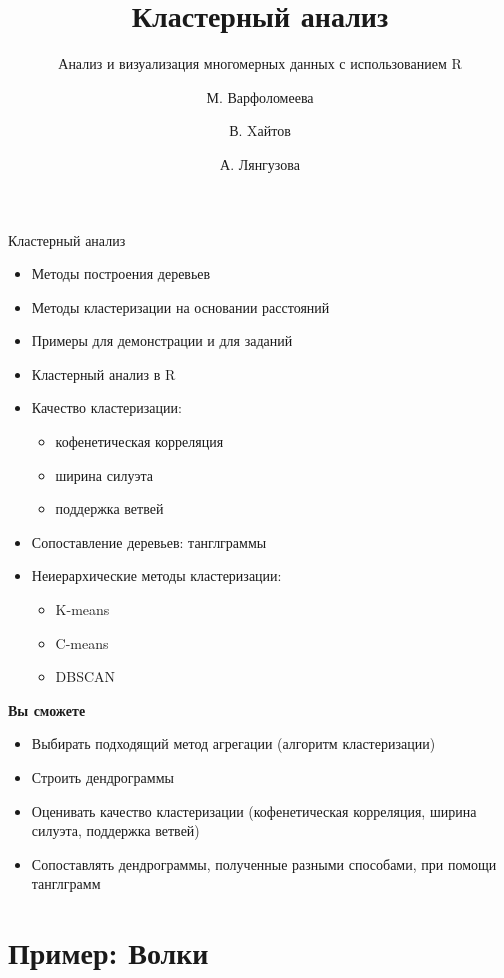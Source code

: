 \documentclass[
  ignorenonframetext,
  russian,
]{beamer}
\title{\texorpdfstring{Кластерный анализ}{Кластерный анализ}}
\subtitle{\texorpdfstring{Анализ и визуализация многомерных данных с
использованием
R}{Анализ и визуализация многомерных данных с использованием R}}
\author{М. Варфоломеева \and В. Xайтов \and А. Лянгузова}
\date{}
\providecommand{\tightlist}{%
  \setlength{\itemsep}{0pt}\setlength{\parskip}{0pt}}
\begin{document}
\frame{\titlepage}


\begin{frame}{Кластерный анализ}
\protect{}\label{ux43aux43bux430ux441ux442ux435ux440ux43dux44bux439-ux430ux43dux430ux43bux438ux437}
\begin{itemize}
\tightlist
\item
  Методы построения деревьев
\item
  Методы кластеризации на основании расстояний
\item
  Примеры для демонстрации и для заданий
\item
  Кластерный анализ в R
\item
  Качество кластеризации:

  \begin{itemize}
  \tightlist
  \item
    кофенетическая корреляция
  \item
    ширина силуэта
  \item
    поддержка ветвей
  \end{itemize}
\item
  Сопоставление деревьев: танглграммы
\item
  Неиерархические методы кластеризации:

  \begin{itemize}
  \tightlist
  \item
    K-means
  \item
    C-means
  \item
    DBSCAN
  \end{itemize}
\end{itemize}

\textbf{Вы сможете}

\begin{itemize}
\tightlist
\item
  Выбирать подходящий метод агрегации (алгоритм кластеризации)
\item
  Строить дендрограммы
\item
  Оценивать качество кластеризации (кофенетическая корреляция, ширина
  силуэта, поддержка ветвей)
\item
  Сопоставлять дендрограммы, полученные разными способами, при помощи
  танглграмм
\end{itemize}
\end{frame}

\section{Пример:
Волки}\label{ux43fux440ux438ux43cux435ux440-ux432ux43eux43bux43aux438}
\end{document}
